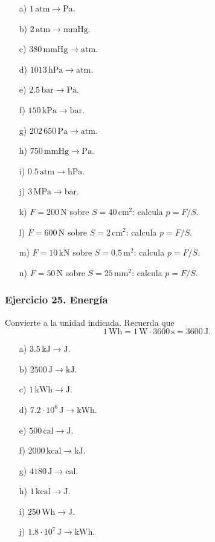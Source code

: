 \begin{enumerate}
    \item[a)] $1\,\mathrm{atm}\rightarrow\mathrm{Pa}$.
    \item[b)] $2\,\mathrm{atm}\rightarrow\mathrm{mmHg}$.
    \item[c)] $380\,\mathrm{mmHg}\rightarrow\mathrm{atm}$.
    \item[d)] $1013\,\mathrm{hPa}\rightarrow\mathrm{atm}$.
    \item[e)] $2.5\,\mathrm{bar}\rightarrow\mathrm{Pa}$.
    \item[f)] $150\,\mathrm{kPa}\rightarrow\mathrm{bar}$.
    \item[g)] $202\,650\,\mathrm{Pa}\rightarrow\mathrm{atm}$.
    \item[h)] $750\,\mathrm{mmHg}\rightarrow\mathrm{Pa}$.
    \item[i)] $0.5\,\mathrm{atm}\rightarrow\mathrm{hPa}$.
    \item[j)] $3\,\mathrm{MPa}\rightarrow\mathrm{bar}$.
    \item[k)] $F=200\,\mathrm{N}$ sobre $S=40\,\mathrm{cm^2}$:
    calcula $p=F/S$.
    \item[l)] $F=600\,\mathrm{N}$ sobre $S=2\,\mathrm{cm^2}$:
    calcula $p=F/S$.
    \item[m)] $F=10\,\mathrm{kN}$ sobre $S=0.5\,\mathrm{m^2}$:
    calcula $p=F/S$.
    \item[n)] $F=50\,\mathrm{N}$ sobre $S=25\,\mathrm{mm^2}$:
    calcula $p=F/S$.
\end{enumerate}

\subsubsection*{Ejercicio 25. Energía}

Convierte a la unidad indicada. Recuerda que
\[
1\,\mathrm{Wh}=1\,\mathrm{W}\cdot3600\,\mathrm{s}
=3600\,\mathrm{J}.
\]

\begin{enumerate}
    \item[a)] $3.5\,\mathrm{kJ}\rightarrow\mathrm{J}$.
    \item[b)] $2500\,\mathrm{J}\rightarrow\mathrm{kJ}$.
    \item[c)] $1\,\mathrm{kWh}\rightarrow\mathrm{J}$.
    \item[d)] $7.2\cdot10^6\,\mathrm{J}\rightarrow\mathrm{kWh}$.
    \item[e)] $500\,\mathrm{cal}\rightarrow\mathrm{J}$.
    \item[f)] $2000\,\mathrm{kcal}\rightarrow\mathrm{kJ}$.
    \item[g)] $4180\,\mathrm{J}\rightarrow\mathrm{cal}$.
    \item[h)] $1\,\mathrm{kcal}\rightarrow\mathrm{J}$.
    \item[i)] $250\,\mathrm{Wh}\rightarrow\mathrm{J}$.
    \item[j)] $1.8\cdot10^7\,\mathrm{J}\rightarrow\mathrm{kWh}$.
\end{enumerate}

